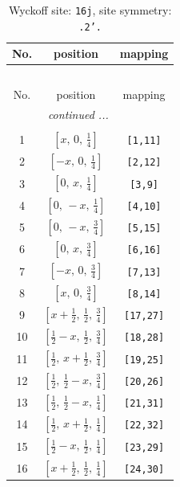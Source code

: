 \documentclass[fleqn,8pt]{jsarticle}
\begin{document}
\renewcommand{\arraystretch}{1.2}
\begin{longtable}{ccc}
\caption{Wyckoff site: {\tt 16j}, site symmetry: {\tt .2'.}}
 \\
 \hline \hline
No. & position & mapping \\ \hline \endfirsthead

\multicolumn{2}{l}{\tablename\ \thetable{}} \\
 \hline \hline
No. & position & mapping \\ \hline \endhead

 \hline \hline
\multicolumn{2}{r}{\footnotesize\it continued ...} \\ \endfoot

 \hline \hline
\multicolumn{2}{r}{} \\ \endlastfoot

1 & $\left[ x,\, 0,\, \frac{1}{4} \right]$ & {\tt [1,11]} \\ \hline
2 & $\left[ - x,\, 0,\, \frac{1}{4} \right]$ & {\tt [2,12]} \\ \hline
3 & $\left[ 0,\, x,\, \frac{1}{4} \right]$ & {\tt [3,9]} \\ \hline
4 & $\left[ 0,\, - x,\, \frac{1}{4} \right]$ & {\tt [4,10]} \\ \hline
5 & $\left[ 0,\, - x,\, \frac{3}{4} \right]$ & {\tt [5,15]} \\ \hline
6 & $\left[ 0,\, x,\, \frac{3}{4} \right]$ & {\tt [6,16]} \\ \hline
7 & $\left[ - x,\, 0,\, \frac{3}{4} \right]$ & {\tt [7,13]} \\ \hline
8 & $\left[ x,\, 0,\, \frac{3}{4} \right]$ & {\tt [8,14]} \\ \hline
9 & $\left[ x + \frac{1}{2},\, \frac{1}{2},\, \frac{3}{4} \right]$ & {\tt [17,27]} \\ \hline
10 & $\left[ \frac{1}{2} - x,\, \frac{1}{2},\, \frac{3}{4} \right]$ & {\tt [18,28]} \\ \hline
11 & $\left[ \frac{1}{2},\, x + \frac{1}{2},\, \frac{3}{4} \right]$ & {\tt [19,25]} \\ \hline
12 & $\left[ \frac{1}{2},\, \frac{1}{2} - x,\, \frac{3}{4} \right]$ & {\tt [20,26]} \\ \hline
13 & $\left[ \frac{1}{2},\, \frac{1}{2} - x,\, \frac{1}{4} \right]$ & {\tt [21,31]} \\ \hline
14 & $\left[ \frac{1}{2},\, x + \frac{1}{2},\, \frac{1}{4} \right]$ & {\tt [22,32]} \\ \hline
15 & $\left[ \frac{1}{2} - x,\, \frac{1}{2},\, \frac{1}{4} \right]$ & {\tt [23,29]} \\ \hline
16 & $\left[ x + \frac{1}{2},\, \frac{1}{2},\, \frac{1}{4} \right]$ & {\tt [24,30]} \\
\end{longtable}
\end{document}
